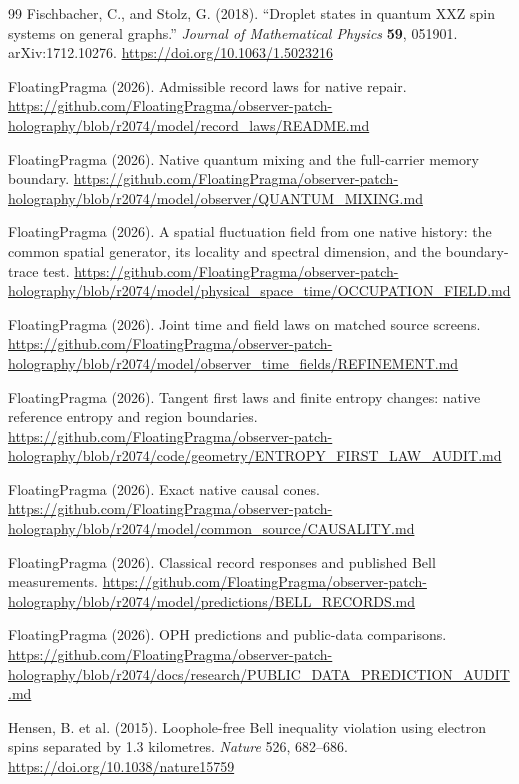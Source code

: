\documentclass[11pt]{article}
\theoremstyle{definition}
\theoremstyle{remark}
\begin{document}
{\begin{thebibliography}{99}
Fischbacher, C., and Stolz, G. (2018). ``Droplet states in quantum XXZ
spin systems on general graphs.'' \emph{Journal of Mathematical Physics}
\textbf{59}, 051901. arXiv:1712.10276.
\url{https://doi.org/10.1063/1.5023216}

FloatingPragma (2026). Admissible record laws for native repair.
\url{https://github.com/FloatingPragma/observer-patch-holography/blob/r2074/model/record_laws/README.md}

FloatingPragma (2026). Native quantum mixing and the full-carrier memory
boundary.
\url{https://github.com/FloatingPragma/observer-patch-holography/blob/r2074/model/observer/QUANTUM_MIXING.md}

FloatingPragma (2026). A spatial fluctuation field from one native history:
the common spatial generator, its locality and spectral dimension, and the
boundary-trace test.
\url{https://github.com/FloatingPragma/observer-patch-holography/blob/r2074/model/physical_space_time/OCCUPATION_FIELD.md}

FloatingPragma (2026). Joint time and field laws on matched source screens.
\url{https://github.com/FloatingPragma/observer-patch-holography/blob/r2074/model/observer_time_fields/REFINEMENT.md}

FloatingPragma (2026). Tangent first laws and finite entropy changes:
native reference entropy and region boundaries.
\url{https://github.com/FloatingPragma/observer-patch-holography/blob/r2074/code/geometry/ENTROPY_FIRST_LAW_AUDIT.md}

FloatingPragma (2026). Exact native causal cones.
\url{https://github.com/FloatingPragma/observer-patch-holography/blob/r2074/model/common_source/CAUSALITY.md}

FloatingPragma (2026). Classical record responses and published Bell
measurements.
\url{https://github.com/FloatingPragma/observer-patch-holography/blob/r2074/model/predictions/BELL_RECORDS.md}

FloatingPragma (2026). OPH predictions and public-data comparisons.
\url{https://github.com/FloatingPragma/observer-patch-holography/blob/r2074/docs/research/PUBLIC_DATA_PREDICTION_AUDIT.md}

Hensen, B. et al. (2015). Loophole-free Bell inequality violation using
electron spins separated by 1.3 kilometres. \emph{Nature} 526, 682--686.
\url{https://doi.org/10.1038/nature15759}


\end{thebibliography}}
\end{document}
